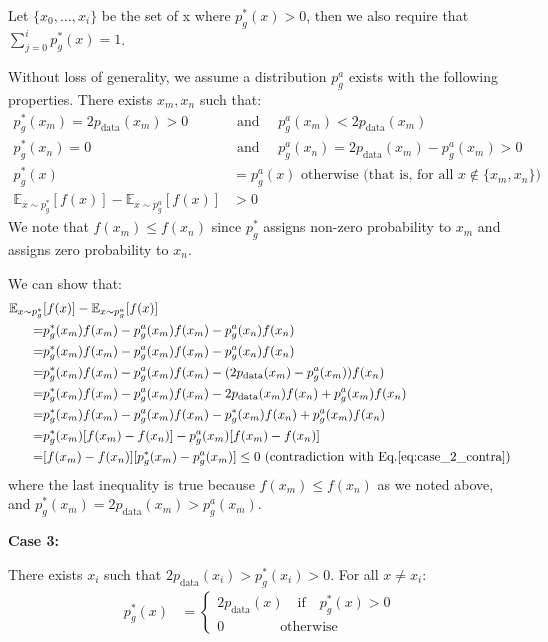 Let $\{ x_0, \ldots, x_i \}$ be the set of x where $p^*_{g} (x) > 0$, then we also require that $\sum_{j=0}^i p^*_{g} (x) = 1 $.

Without loss of generality, we assume a distribution $p^a_g$ exists with the following properties. There exists $x_m, x_n$ such that:
\begin{align}
    p^*_{g} (x_m) = 2p_{\text{data}} (x_m) > 0 \quad & \text{ and } \quad  p^a_g (x_m) < 2p_{\text{data}} (x_m) \\
    p^*_{g} (x_n) = 0 \quad & \text{ and } \quad p^a_g (x_n) = 2p_{\text{data}} (x_m) - p^a_g (x_m) > 0  \\
    p^*_{g} (x) & = p^a_g (x) \text{ otherwise (that is, for all } x \notin \{x_m, x_n\}) \\ 
    \mathbb{E}_{ x \sim p^*_g } [ f ( x ) ] - \mathbb{E}_{ x \sim p^a_g } [ f ( x ) ] & > 0 \label{eq:case_2_contra}
\end{align}
We note that $f(x_m) \leq f(x_n)$ since $p^*_{g}$ assigns non-zero probability to $x_m$ and assigns zero probability to $x_n$.

We can show that:
\begin{align}
\mathbb{E}_{ x \sim p^*_g } & [ f ( x ) ] - \mathbb{E}_{ x \sim p^a_g } [ f ( x ) ] \\
= & p^*_g (x_m) f(x_m) - p^a_g (x_m) f(x_m) - p^a_g (x_n) f(x_n) \\ 
= & p^*_g (x_m) f(x_m) - p^a_g (x_m) f(x_m) - p^a_g (x_n) f(x_n) \\ 
= & p^*_g (x_m) f(x_m) - p^a_g (x_m) f(x_m) - (2p_{\text{data}} (x_m) - p^a_g (x_m)) f(x_n) \\ 
= & p^*_g (x_m) f(x_m) - p^a_g (x_m) f(x_m) - 2p_{\text{data}} (x_m) f(x_n) + p^a_g (x_m) f(x_n) \\ 
= & p^*_g (x_m) f(x_m) - p^a_g (x_m) f(x_m) - p^*_g (x_m) f(x_n) + p^a_g (x_m) f(x_n) \\ 
= & p^*_g (x_m) [f(x_m) - f(x_n)] - p^a_g (x_m) [f(x_m) - f(x_n)] \\ 
= & [f(x_m) - f(x_n)] [p^*_g (x_m)  - p^a_g (x_m)] \leq 0 \text{ (contradiction with Eq.} \ref{eq:case_2_contra} )
\end{align}
where the last inequality is true because $f(x_m) \leq f(x_n)$ as we noted above, and $p^*_g (x_m) = 2p_{\text{data}} (x_m) > p^a_g (x_m)$.

\textbf{Case 3:}

There exists $x_i$ such that $2p_{\text{data}} (x_i) > p^*_g(x_i) > 0$.
For all $x \neq x_i$:
\begin{align}
    p^*_{g} (x) & = \begin{cases}
    2p_{\text{data}} (x) \quad  \text{if} \quad p^*_{g} (x) > 0 \\
    0 \quad \quad  \quad \quad \text{otherwise}
    \end{cases}
\end{align}

